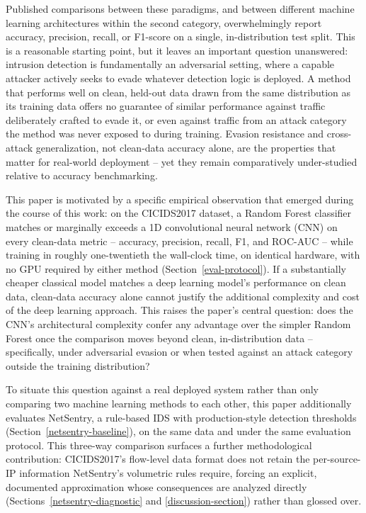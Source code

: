 \documentclass[conference]{IEEEtran}
\begin{document}
Published comparisons between these paradigms, and between different machine learning architectures within the second category, overwhelmingly report accuracy, precision, recall, or F1-score on a single, in-distribution test split. This is a reasonable starting point, but it leaves an important question unanswered: intrusion detection is fundamentally an adversarial setting, where a capable attacker actively seeks to evade whatever detection logic is deployed. A method that performs well on clean, held-out data drawn from the same distribution as its training data offers no guarantee of similar performance against traffic deliberately crafted to evade it, or even against traffic from an attack category the method was never exposed to during training. Evasion resistance and cross-attack generalization, not clean-data accuracy alone, are the properties that matter for real-world deployment -- yet they remain comparatively under-studied relative to accuracy benchmarking.
 
This paper is motivated by a specific empirical observation that emerged during the course of this work: on the CICIDS2017 dataset, a Random Forest classifier matches or marginally exceeds a 1D convolutional neural network (CNN) on every clean-data metric -- accuracy, precision, recall, F1, and ROC-AUC -- while training in roughly one-twentieth the wall-clock time, on identical hardware, with no GPU required by either method (Section~\ref{eval-protocol}). If a substantially cheaper classical model matches a deep learning model's performance on clean data, clean-data accuracy alone cannot justify the additional complexity and cost of the deep learning approach. This raises the paper's central question: does the CNN's architectural complexity confer any advantage over the simpler Random Forest once the comparison moves beyond clean, in-distribution data -- specifically, under adversarial evasion or when tested against an attack category outside the training distribution?
 
To situate this question against a real deployed system rather than only comparing two machine learning methods to each other, this paper additionally evaluates NetSentry, a rule-based IDS with production-style detection thresholds (Section~\ref{netsentry-baseline}), on the same data and under the same evaluation protocol. This three-way comparison surfaces a further methodological contribution: CICIDS2017's flow-level data format does not retain the per-source-IP information NetSentry's volumetric rules require, forcing an explicit, documented approximation whose consequences are analyzed directly (Sections~\ref{netsentry-diagnostic} and \ref{discussion-section}) rather than glossed over.
 
\end{document}
